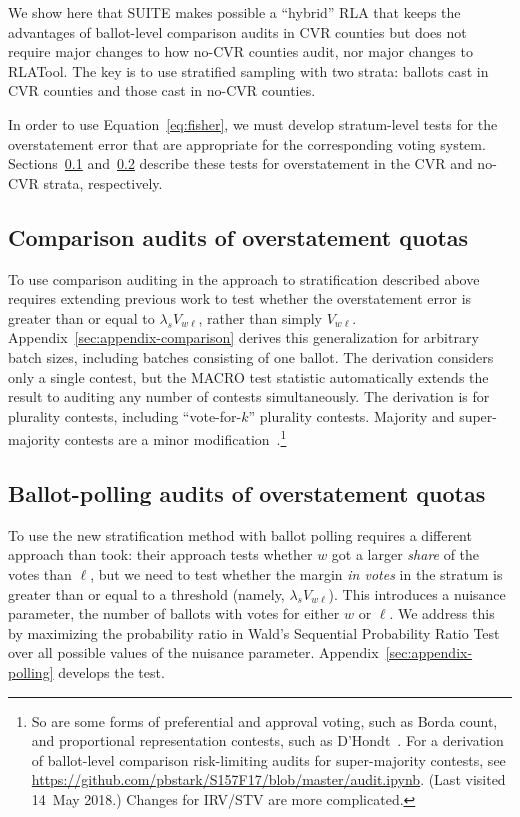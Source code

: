 \documentclass[runningheads]{llncs}
\begin{document}
We show here that SUITE makes possible a ``hybrid'' RLA that keeps the advantages of ballot-level comparison audits in CVR counties but does not require major changes to how no-CVR counties audit, nor major changes to RLATool. 
The key is to use stratified sampling with two strata: ballots cast in CVR counties and those cast in no-CVR counties.

In order to use Equation~\ref{eq:fisher}, we must develop stratum-level tests for the overstatement error that are appropriate for the corresponding voting system.
Sections~\ref{sec:comparisonError} and~\ref{sec:ballotPollError} describe these tests for overstatement in the CVR and no-CVR strata, respectively.

\subsection{Comparison audits of overstatement quotas}
\label{sec:comparisonError}

To use comparison auditing in the approach to stratification described above requires extending previous work to test whether the overstatement error is greater than or equal to $\lambda_s V_{w\ell}$, rather than simply $V_{w\ell}$.
Appendix~\ref{sec:appendix-comparison} derives this generalization for arbitrary batch sizes, including batches consisting of one ballot.
The derivation considers only a single contest, but the 
MACRO test statistic \cite{stark09c,stark10d} automatically extends the result to 
auditing any number of contests simultaneously.
The derivation is for plurality contests, including ``vote-for-$k$'' plurality contests.
Majority and super-majority contests are a minor 
modification~\cite{stark08a}.\footnote{%
  So are some forms of preferential and approval voting, such as Borda count, and
  proportional representation contests, such as D'Hondt~\cite{starkTeague14}.
  For a derivation of ballot-level comparison risk-limiting audits for super-majority contests, 
  see \url{https://github.com/pbstark/S157F17/blob/master/audit.ipynb}. (Last visited 14~May 2018.)
  Changes for IRV/STV are more complicated.
}

\subsection{Ballot-polling audits of overstatement quotas}
\label{sec:ballotPollError}

To use the new stratification method with ballot polling requires a different approach than \cite{lindemanEtal12} took: their approach tests whether $w$ got a larger \emph{share} of the votes than $\ell$, but we need to test whether the margin \emph{in votes} in the stratum is greater than or equal to a threshold (namely, $\lambda_s V_{w\ell}$).
This introduces a nuisance parameter, the number of ballots with votes for either $w$ or $\ell$.
We address this by maximizing the probability ratio in Wald's Sequential Probability Ratio Test 
\cite{wald45} over all possible values of the nuisance parameter.
Appendix~\ref{sec:appendix-polling} develops the test.
\end{document}
